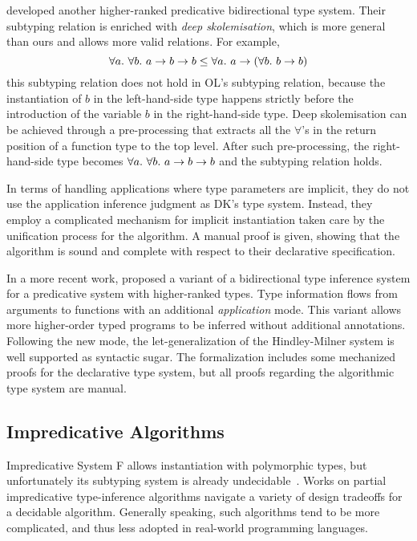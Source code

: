\citet{jones2007practical} developed another higher-ranked predicative bidirectional type system.
Their subtyping relation is enriched with \emph{deep skolemisation},
which is more general than ours and allows more valid relations.
For example,
$$\all{\all[b] a \to b \to b} \le \all a \to (\all[b] b \to b)$$
this subtyping relation does not hold in OL's subtyping relation,
because the instantiation of $b$ in the left-hand-side type
happens strictly before the introduction of
the variable $b$ in the right-hand-side type.
Deep skolemisation can be achieved through
a pre-processing that extracts all the $\forall$'s
in the return position of a function type to the top level.
After such pre-processing, the right-hand-side type becomes
$\all {\all[b] a \to b \to b}$ and the subtyping relation holds.

In terms of handling applications where type parameters are implicit,
they do not use the application inference judgment as DK's type system.
Instead, they employ a complicated mechanism for implicit instantiation
taken care by the unification process for the algorithm.
A manual proof is given, showing that the algorithm is sound and
complete with respect to their declarative specification.

In a more recent work, \citet{xie2018letarguments} proposed a variant of a
bidirectional type inference system for a predicative system with higher-ranked types.
Type information flows from arguments to
functions with an additional \emph{application} mode. This variant 
allows more higher-order typed programs to be inferred without additional annotations.
Following the new mode, the let-generalization of the Hindley-Milner system
is well supported as syntactic sugar. The formalization includes some
mechanized proofs for the declarative type system, but all proofs regarding
the algorithmic type system are manual.

\subsection{Impredicative Algorithms}

Impredicative System F allows instantiation with polymorphic types,
but unfortunately its subtyping system is already undecidable~\citep{tiuryn1996subtyping}.
Works on partial impredicative type-inference algorithms
navigate a variety of design tradeoffs for a decidable algorithm.
Generally speaking, such algorithms tend to be more complicated,
and thus less adopted in real-world programming languages.

